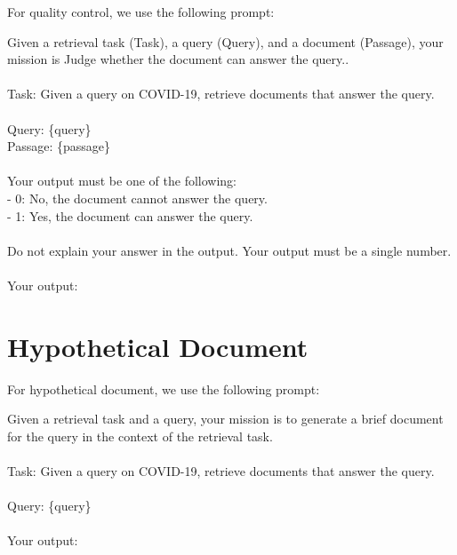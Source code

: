 For quality control, we use the following prompt:
\begin{mdframed}[backgroundcolor=gray!20, linecolor=gray]
\small
Given a retrieval task (Task), a query (Query), and a document (Passage), your mission is Judge whether the document can answer the query..\\
\\
Task: Given a query on COVID-19, retrieve documents that answer the query.\\
\\
Query: \{query\}\\
Passage: \{passage\}\\
\\
Your output must be one of the following:\\
- 0: No, the document cannot answer the query.\\
- 1: Yes, the document can answer the query.\\
\\
Do not explain your answer in the output. Your output must be a single number.\\
\\
Your output:
\end{mdframed}

\section{Hypothetical Document}
For hypothetical document, we use the following prompt:

\begin{mdframed}[backgroundcolor=gray!20, linecolor=gray]
\small
Given a retrieval task and a query, your mission is to generate a brief document for the query in the context of the retrieval task.\\
\\
Task: Given a query on COVID-19, retrieve documents that answer the query.\\
\\
Query: \{query\}\\
\\
Your output:
\end{mdframed}